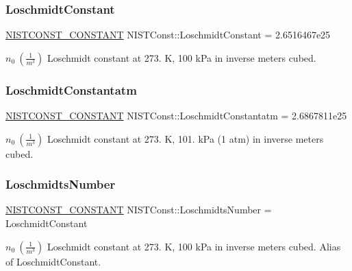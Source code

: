 \subsubsection{\texorpdfstring{Loschmidt\+Constant}{LoschmidtConstant}}
{\footnotesize\ttfamily \mbox{\hyperlink{group___n_i_s_t_const-_macros_ga2b0fc1d7452373f816175dd86ce26729}{N\+I\+S\+T\+C\+O\+N\+S\+T\+\_\+\+C\+O\+N\+S\+T\+A\+NT}} N\+I\+S\+T\+Const\+::\+Loschmidt\+Constant = 2.\+6516467e25}

$n_0 \ (\frac{1}{m^3})$ Loschmidt constant at 273. K, 100 k\+Pa in inverse meters cubed. \mbox{\label{group___n_i_s_t_const-_loschmidt_constant_gae68f5d2d04353bd4cf30faa8cb935734}} 
\subsubsection{\texorpdfstring{Loschmidt\+Constantatm}{LoschmidtConstantatm}}
{\footnotesize\ttfamily \mbox{\hyperlink{group___n_i_s_t_const-_macros_ga2b0fc1d7452373f816175dd86ce26729}{N\+I\+S\+T\+C\+O\+N\+S\+T\+\_\+\+C\+O\+N\+S\+T\+A\+NT}} N\+I\+S\+T\+Const\+::\+Loschmidt\+Constantatm = 2.\+6867811e25}

$n_0 \ (\frac{1}{m^3})$ Loschmidt constant at 273. K, 101. k\+Pa (1 atm) in inverse meters cubed. \mbox{\label{group___n_i_s_t_const-_loschmidt_constant_gae01f2b75c0a0b05fd5421782598dbfee}} 
\subsubsection{\texorpdfstring{Loschmidts\+Number}{LoschmidtsNumber}}
{\footnotesize\ttfamily \mbox{\hyperlink{group___n_i_s_t_const-_macros_ga2b0fc1d7452373f816175dd86ce26729}{N\+I\+S\+T\+C\+O\+N\+S\+T\+\_\+\+C\+O\+N\+S\+T\+A\+NT}} N\+I\+S\+T\+Const\+::\+Loschmidts\+Number = Loschmidt\+Constant}

$n_0 \ (\frac{1}{m^3})$ Loschmidt constant at 273. K, 100 k\+Pa in inverse meters cubed. Alias of Loschmidt\+Constant. \mbox{\label{group___n_i_s_t_const-_loschmidt_constant_ga057a58a522fa17fedca02a7508535bf4}} 
